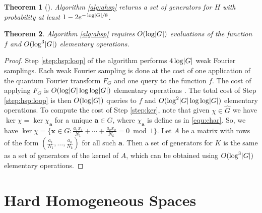 \documentclass[11pt]{article}
\theoremstyle{plain}
\newtheorem{theorem}{Theorem}[section]
\theoremstyle{definition}
\DeclarePairedDelimiter{\abs}{\lvert}{\rvert}
\begin{document}
\begin{theorem}[{\cite[Theorem 4.3]{hallgren2003hidden}}]
	Algorithm \ref{alg:ahsp} returns a set of generators for $H$ with probability at least $1 - 
	2e^{-\log \abs{G} / 8}$.
\end{theorem}

\begin{theorem}
	\label{thm:ahsp-time}
	Algorithm \ref{alg:ahsp} requires $O(\log \abs{G})$ evaluations of the function $f$ and 
	$O(\log^3 \abs{G})$ elementary operations.
\end{theorem}
\begin{proof}
	Step \ref{step:hsp:loop} of the algorithm performs $4\log \abs{G}$ weak Fourier samplings. Each 
	weak Fourier sampling is done at the cost of one application of the quantum Fourier transform 
	$F_G$ and one query to the function $f$. The cost of applying $F_G$ is $O(\log \abs{G} \log\log 
	\abs{G})$ elementary operations \cite{cleve1998quantum}. The total cost of Step 
	\ref{step:hsp:loop} is then $O(\log \abs{G})$ queries to $f$ and $O(\log^2 \abs{G} \log\log 
	\abs{G})$ elementary operations. To compute the cost of Step \ref{step:ker}, note that given 
	$\chi \in \widehat{G}$ we have $\ker \chi = \ker \chi_{\bm{a}}$ for a unique $\bm{a} \in G$, where  
	$\chi_{\bm{a}}$ is define as in \eqref{equ:char}. So, we have $\ker \chi = \{ \bm{x} \in G: 
	\frac{a_1x_1}{N_1} + \cdots + \frac{a_kx_k}{N_k} = 0 \bmod 1 \}$. Let $A$ be a matrix with rows 
	of the form $(\frac{a_1}{N_1}, \dots, \frac{a_k}{N_k})$ for all such $\bm{a}$. Then a set of 
	generators for $K$ is the same as a set of generators of the kernel of $A$, which can be 
	obtained using $O(\log^3 \abs{G})$ elementary operations.
\end{proof}





\section{Hard Homogeneous Spaces}
\label{sec:hhs}
\end{document}
